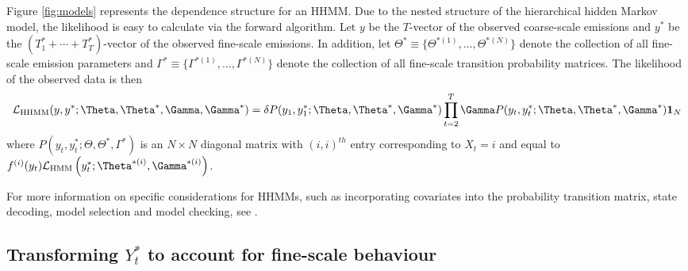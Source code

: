 Figure \ref{fig:models} represents the dependence structure for an HHMM. Due to the nested structure of the hierarchical hidden Markov model, the likelihood is easy to calculate via the forward algorithm.
%
Let $y$ be the $T$-vector of the observed coarse-scale emissions and
$y^*$ be the $(T_1^* + \cdots + T_T^*)$-vector of the observed fine-scale emissions.
%
In addition, let $\Theta^* \equiv \{\Theta^{*(1)}, \ldots, \Theta^{*(N)}\}$ denote the collection of all fine-scale emission parameters and $\Gamma^* \equiv \{\Gamma^{*(1)}, \ldots, \Gamma^{*(N)}\}$ denote the collection of all fine-scale transition probability matrices. The likelihood of the observed data is then
%
\[
\calL_{\text{HHMM}}(y,y^*;\Theta,\Theta^*,\Gamma,\Gamma^*) = \delta P(y_1,y_1^*;\Theta,\Theta^*,\Gamma^*) \prod_{t=2}^T \Gamma P(y_t,y_t^*;\Theta,\Theta^*,\Gamma^*) \mathbf{1}_N
\]
%
where $P(y_t,y_t^*;\Theta,\Theta^*,\Gamma^*)$ is an $N \times N$ diagonal matrix with $(i,i)^{th}$ entry corresponding to $X_t=i$ and equal to 
$f^{(i)}(y_t)\calL_{\text{HMM}}\left(y_t^*;\Theta^{*(i)},
\Gamma^{*(i)}\right)$. 

For more information on specific considerations for HHMMs, such as incorporating covariates into the probability transition matrix, state decoding, model selection and model checking, see \citet{Adam:2019}. 

\subsection{Transforming $Y_t^*$ to account for fine-scale behaviour}
\label{subsec:STFT}

